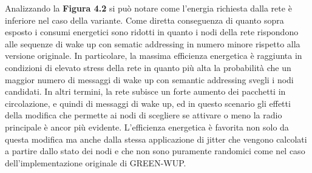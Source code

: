 \documentclass[binding=0.6cm,TFA]{sapthesis}
\begin{document}
Analizzando la \textbf{Figura 4.2} si può notare come l'energia richiesta dalla rete è inferiore nel caso della variante. Come diretta conseguenza di quanto
sopra esposto i consumi energetici sono ridotti in quanto i nodi della rete rispondono alle sequenze di wake up con sematic addressing in
numero minore rispetto alla versione originale. In particolare, la massima efficienza energetica è raggiunta in condizioni di elevato stress
della rete in quanto più alta la probabilità che un maggior numero di messaggi di wake up con semantic addressing svegli i nodi candidati. In altri
termini, la rete subisce un forte aumento dei pacchetti in circolazione, e quindi di messaggi di wake up, ed in questo scenario gli effetti della
modifica che permette ai nodi di scegliere se attivare o meno la radio principale è ancor più evidente. L'efficienza energetica è favorita non solo
da questa modifica ma anche dalla stessa applicazione di jitter che vengono calcolati a partire dallo stato dei nodi
e che non sono puramente randomici come nel caso dell'implementazione originale di GREEN-WUP.

\newpage
\end{document}
